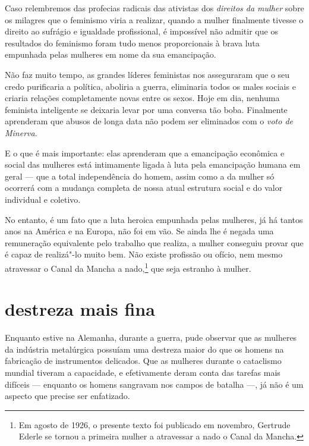 \begin{center}
\end{center}

Caso relembremos das profecias radicais das ativistas dos \textit{direitos da
mulher} sobre os milagres que o feminismo viria a realizar, quando a
mulher finalmente tivesse o direito ao sufrágio e igualdade
profissional, é impossível não admitir que os resultados do feminismo
foram tudo menos proporcionais à brava luta empunhada pelas mulheres em
nome da sua emancipação.

Não faz muito tempo, as grandes líderes feministas nos asseguraram
que o seu credo purificaria a política, aboliria a guerra, eliminaria
todos os males sociais e criaria relações completamente novas entre os
sexos. Hoje em dia, nenhuma feminista inteligente se deixaria levar por
uma conversa tão boba. Finalmente aprenderam que abusos de longa
data não podem ser eliminados com o \textit{voto de Minerva}.

E o que é mais importante: elas aprenderam que a emancipação econômica e
social das mulheres está intimamente ligada à luta pela emancipação
humana em geral --- que a total independência do homem, assim como a da
mulher só ocorrerá com a mudança completa de nossa atual estrutura
social e do valor individual e coletivo.

No entanto, é um fato que a luta heroica empunhada pelas mulheres, já há
tantos anos na América e na Europa, não foi em vão. Se ainda lhe é
negada uma remuneração equivalente pelo trabalho que realiza, a mulher
conseguiu provar que é capaz de realizá"-lo muito bem. Não existe
profissão ou ofício, nem mesmo atravessar o Canal da Mancha a
nado,\footnote{Em agosto de 1926, o presente texto foi publicado em
  novembro, Gertrude Ederle se tornou a primeira mulher a atravessar a
  nado o Canal da Mancha.} que seja estranho à mulher.

\section{destreza mais fina}

Enquanto estive na Alemanha, durante a guerra, pude observar que as
mulheres da indústria metalúrgica possuíam uma destreza maior do que os
homens na fabricação de instrumentos delicados. Que as mulheres durante
o cataclismo mundial tiveram a capacidade, e efetivamente
deram conta das tarefas mais difíceis --- enquanto os homens sangravam
nos campos de batalha ---, já não é um aspecto que precise ser
enfatizado.


